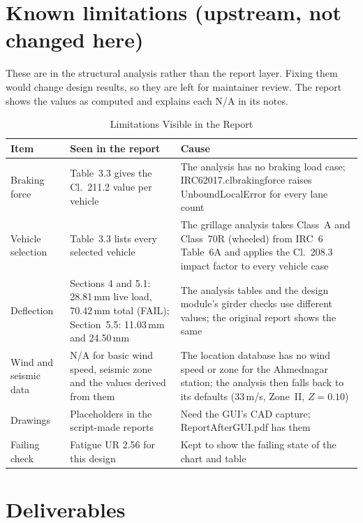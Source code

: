 \documentclass[11pt,a4paper]{article}
\newcommand{\thead}{\rowcolor{headbg}}
\newcommand{\hd}[1]{\sffamily\bfseries\color{ink}#1}
\newcommand{\breakus}{\textunderscore\allowbreak}
\newcommand{\code}[1]{{\ttfamily\let\_\breakus #1}}
\newcommand{\file}[1]{{\ttfamily\let\_\breakus #1}}
\begin{document}
\section{Known limitations (upstream, not changed here)}\label{sec:limits}

These are in the structural analysis rather than the report layer. Fixing them would change design results, so they
are left for maintainer review. The report shows the values as computed and explains each N/A in its notes.

\begin{table}[!htbp]
\caption{Limitations Visible in the Report}
\small
\begin{tabularx}{\linewidth}{@{}L{3.4cm} Y Y@{}}
\toprule
\thead \hd{Item} & \hd{Seen in the report} & \hd{Cause} \\
\midrule
Braking force & Table~3.3 gives the Cl.~211.2 value per vehicle & The analysis has no braking load case;
\code{IRC6\_2017.cl\_211\_2\_braking\_force} raises \code{UnboundLocalError} for every lane count \\
Vehicle selection & Table~3.3 lists every selected vehicle & The grillage analysis takes Class~A and Class~70R
(wheeled) from IRC~6 Table~6A and applies the Cl.~208.3 impact factor to every vehicle case \\
Deflection & Sections 4 and 5.1: 28.81\,mm live load, 70.42\,mm total (FAIL); Section~5.5: 11.03\,mm and 24.50\,mm &
The analysis tables and the design module's girder checks use different values; the original report shows the same \\
Wind and seismic data & N/A for basic wind speed, seismic zone and the values derived from them & The location
database has no wind speed or zone for the Ahmednagar station; the analysis then falls back to its defaults (33\,m/s,
Zone~II, $Z = 0.10$) \\
Drawings & Placeholders in the script-made reports & Need the GUI's CAD capture; \file{Report\_After\_GUI.pdf} has them \\
Failing check & Fatigue UR 2.56 for this design & Kept to show the failing state of the chart and table \\
\bottomrule
\end{tabularx}
\end{table}

\section{Deliverables}
\end{document}

